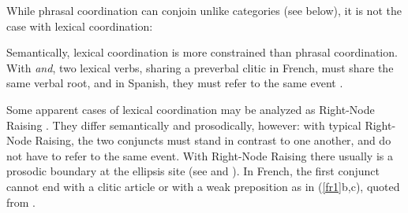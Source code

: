 {While phrasal coordination can conjoin unlike categories (see below), it is not the case with lexical coordination:

\begin{exe}
 \ex
\begin{xlista}
\end{xlista}
\end{exe}

Semantically, lexical coordination is more constrained than phrasal coordination. With \textit{and}, two lexical verbs, sharing a preverbal clitic in French, must share the same verbal root, and in Spanish, they must refer to the same event \citep{Bosque:86}.

\eal
{}
\zl

Some apparent cases of lexical coordination may be analyzed as Right-Node Raising
\citep{Beavers}. They differ semantically and prosodically, however: with typical Right-Node
Raising, the two conjuncts must stand in contrast to one another, and do not have to refer to the
same event. With Right-Node Raising there usually is a prosodic boundary at the ellipsis site (see
\citet[843--844]{chavesrnr} and ). In French, the first conjunct cannot end with a clitic article or with a weak preposition as in (\ref{fr1}b,c), quoted from \citep[]{Abeille:06}.

}
